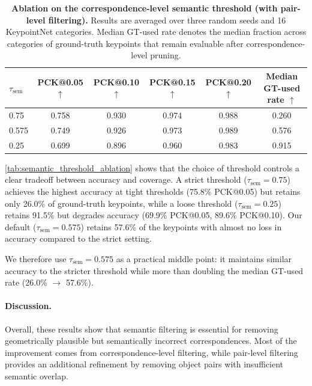 \begin{table}[h!]
\centering
\small
\caption{\textbf{Ablation on the correspondence-level semantic threshold (with pair-level filtering).}
Results are averaged over three random seeds and 16 KeypointNet categories. Median GT-used rate denotes the median fraction across categories of ground-truth keypoints that remain evaluable after correspondence-level pruning.}
\label{tab:semantic_threshold_ablation}
\setlength{\tabcolsep}{5pt}
\begin{tabular}{lccccc}
\toprule
$\tau_{\mathrm{sem}}$ & PCK@0.05 $\uparrow$ & PCK@0.10 $\uparrow$ & PCK@0.15 $\uparrow$ & PCK@0.20 $\uparrow$ & Median GT-used rate $\uparrow$ \\
\midrule
0.75  & 0.758 & 0.930 & 0.974 & 0.988 & 0.260 \\
0.575 & 0.749 & 0.926 & 0.973 & 0.989 & 0.576 \\
0.25  & 0.699 & 0.896 & 0.960 & 0.983 & 0.915 \\
\bottomrule
\end{tabular}
\end{table}

\autoref{tab:semantic_threshold_ablation} shows that the choice of threshold controls a clear tradeoff between
accuracy and coverage. A strict threshold ($\tau_{\mathrm{sem}}=0.75$) achieves the highest accuracy at tight
thresholds (75.8\% PCK@0.05) but retains only 26.0\% of ground-truth keypoints, while a loose threshold
($\tau_{\mathrm{sem}}=0.25$) retains 91.5\% but degrades accuracy (69.9\% PCK@0.05, 89.6\% PCK@0.10).
Our default ($\tau_{\mathrm{sem}}=0.575$) retains 57.6\% of the keypoints with almost no loss in accuracy
compared to the strict setting.


We therefore use $\tau_{\mathrm{sem}}=0.575$ as a practical middle point: it maintains similar accuracy to the stricter threshold while more than doubling the median GT-used rate (26.0\% $\rightarrow$ 57.6\%).

\paragraph{Discussion.}
Overall, these results show that semantic filtering is essential for removing geometrically plausible but semantically incorrect correspondences. Most of the improvement comes from correspondence-level filtering, while pair-level filtering provides an additional refinement by removing object pairs with insufficient semantic overlap.




